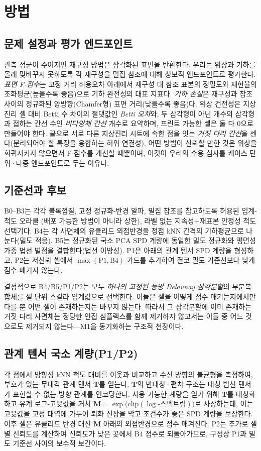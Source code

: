 \documentclass[11pt]{article}
\begin{document}
\section{방법}
\subsection{문제 설정과 평가 엔드포인트}
관측 점군이 주어지면 재구성 방법은 삼각화된 표면을 반환한다. 우리는 위상과 기하를 몰래
맞바꾸지 못하도록 각 재구성을 밀집 참조에 대해 상보적 엔드포인트로 평가한다. \emph{표면 F-점수}는
고정 거리 허용오차 아래에서 재구성 대 참조 표본의 정밀도와 재현율의 조화평균(높을수록 좋음)으로
기하 완전성의 대표 지표다. \emph{기하 손실}은 재구성과 참조 사이의 정규화된 양방향(Chamfer형)
표면 거리(낮을수록 좋음)다. 위상 건전성은 지상진리 셸 대비 Betti 수 차이의 절댓값인
\emph{Betti 오차}와, 두 삼각형이 아닌 개수의 삼각형과 접하는 간선 수인 \emph{비다양체 간선}
개수로 요약하며, 프린트 가능한 셸은 둘 다 0으로 만들어야 한다. 끝으로 서로 다른 지상진리 시트에
속한 점을 잇는 \emph{거짓 다리 간선}을 센다(분리되어야 할 특징을 융합하는 허위 연결성). 어떤
방법이 신뢰할 만한 것은 위상을 회귀시키지 않으면서 F-점수를 개선할 때뿐이며, 이것이 우리의 수용
심사를 케이스 단위·다중 엔드포인트로 두는 이유다.

\subsection{기준선과 후보}
B0--B3는 각각 볼록껍질, 고정 정규화-반경 알파, 밀집 참조를 참고하도록 허용된 임계-척도 오라클
(배포 가능한 방법이 아니라 상한), 라벨 없는 지속성$+$재표본 안정성 척도 선택기다. B4는 각 사면체의
유클리드 외접반경을 정점 kNN 간격의 기하평균으로 나눈다(밀도 적응). B5는 정규화된 국소 PCA SPD
계량에 동일한 밀도 정규화와 평면성 가중 법선 벌점을 결합한다(법선 이방성). P1은 아래의 관계 텐서
SPD 계량을 형성하고, P2는 저신뢰 셀에서 $\max(\text{P1}, \text{B4})$ 가드를 추가하여 결코 밀도
기준선보다 낮게 점수 매기지 않는다.

결정적으로 B4/B5/P1/P2는 모두 \emph{하나의 고정된 등방 Delaunay 삼각분할}의 부분복합체를 셀 단위
스칼라 임계값으로 선택한다. 이들은 셀을 어떻게 점수 매기는지에서만 다를 뿐 어떤 셀이 존재하는지는
바꾸지 않는다. 따라서 그 삼각분할에 이미 존재하는 거짓 다리 사면체는 정당한 인접 심플렉스를 함께
제거하지 않고서는 이들 중 어느 것으로도 제거되지 않는다---M1을 동기화하는 구조적 천장이다.

\subsection{관계 텐서 국소 계량(P1/P2)}
각 점에서 방향성 kNN 척도 대비를 이웃과 비교하고 수신 방향의 불균형을 측정하여, 부호가 있는
무대각 관계 텐서 $\bm{T}$를 얻는다. $\bm{T}$의 반대칭·편차 구조는 대칭 법선 텐서가 표현할 수 없는
방향 관계를 인코딩한다. 사용 가능한 계량을 얻기 위해 $\bm{T}$를 대칭화하고 유계 로그-고윳값을 거쳐
$\bm{M}=\exp\!\big(\mathrm{clip}(\log\text{-스펙트럼})\big)$로 사상하는데, 이는 고윳값을 고정 대역에
가두어 퇴화 신장을 막고 조건수가 좋은 SPD 계량을 보장한다. 이후 셀은 유클리드 반경 대신 $\bm{M}$
아래의 외접반경으로 점수 매겨진다. P2는 추가로 셀별 신뢰도를 계산하여 신뢰도가 낮은 곳에서 B4
점수로 되돌아가므로, 구성상 P1과 밀도 기준선 사이의 보수적 보간이다.
\end{document}
